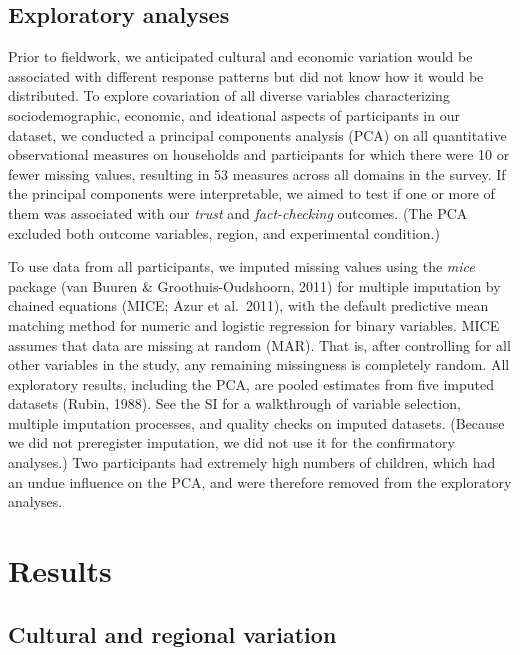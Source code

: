 \documentclass[
  11pt,
]{article}
\begin{document}
\hypertarget{exploratory-analyses}{%
\subsection{Exploratory analyses}\label{exploratory-analyses}}

Prior to fieldwork, we anticipated cultural and economic variation would
be associated with different response patterns but did not know how it
would be distributed. To explore covariation of all diverse variables
characterizing sociodemographic, economic, and ideational aspects of
participants in our dataset, we conducted a principal components
analysis (PCA) on all quantitative observational measures on households
and participants for which there were 10 or fewer missing values,
resulting in 53 measures across all domains in the survey. If the
principal components were interpretable, we aimed to test if one or more
of them was associated with our \emph{trust} and \emph{fact-checking}
outcomes. (The PCA excluded both outcome variables, region, and
experimental condition.)

To use data from all participants, we imputed missing values using the
\emph{mice} package (van Buuren \& Groothuis-Oudshoorn, 2011) for
multiple imputation by chained equations (MICE; Azur et al.~2011), with
the default predictive mean matching method for numeric and logistic
regression for binary variables. MICE assumes that data are missing at
random (MAR). That is, after controlling for all other variables in the
study, any remaining missingness is completely random. All exploratory
results, including the PCA, are pooled estimates from five imputed
datasets (Rubin, 1988). See the SI for a walkthrough of variable
selection, multiple imputation processes, and quality checks on imputed
datasets. (Because we did not preregister imputation, we did not use it
for the confirmatory analyses.) Two participants had extremely high
numbers of children, which had an undue influence on the PCA, and were
therefore removed from the exploratory analyses.

\hypertarget{results}{%
\section{Results}\label{results}}

\hypertarget{cultural-and-regional-variation}{%
\subsection{Cultural and regional
variation}\label{cultural-and-regional-variation}}
\end{document}
